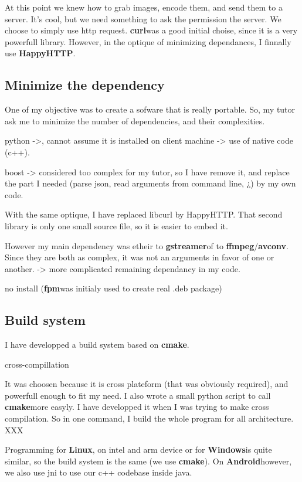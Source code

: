 \documentclass[a4paper,11pt]{custom}
\newcommand{\avconv}{\textbf{avconv}}
\newcommand{\ffmpeg}{\textbf{ffmpeg}}
\newcommand{\gstreamer}{\textbf{gstreamer}}
\newcommand{\curl}{\textbf{curl}}
\newcommand{\happyhttp}{\textbf{HappyHTTP}}
\newcommand{\cmake}{\textbf{cmake}}
\newcommand{\fpm}{\textbf{fpm}}
\newcommand{\linux}{\textbf{Linux}}
\newcommand{\win}{\textbf{Windows}}
\newcommand{\android}{\textbf{Android}}
\begin{document}
At this point we knew how to grab images, encode them, and send them to a
server. It's cool, but we need something to ask the permission the server. We
choose to simply use http request. \curl was a good initial choise, since it is
a very powerfull library. However, in the optique of minimizing dependances, I
finnally use \happyhttp.

\subsection{Minimize the dependency}

One of my objective was to create a sofware that is really portable. So, my
tutor ask me to minimize the number of dependencies, and their complexities.

python ->, cannot assume it is installed on client machine -> use of native code
(c++).

boost -> considered too complex for my tutor, so I have remove it, and replace
the part I needed (parse json, read arguments from command line, ¿) by my own
code.

With the same optique, I have replaced libcurl by HappyHTTP. That second library
is only one small source file, so it is easier to embed it.

However my main dependency was etheir to \gstreamer of to \ffmpeg/\avconv. Since
they are both as complex, it was not an arguments in favor of one or another.
-> more complicated remaining dependancy in my code.


no install (\fpm was initialy used to create real .deb package)

\subsection{Build system}

I have developped a build system based on \cmake.

cross-compillation

It was choosen because it is
cross plateform (that was obviously required), and powerfull enough to fit my
need. I also wrote a small python script to call \cmake more easyly. I have
developped it when I was trying to make cross compilation. So in one command, I
build the whole program for all architecture. XXX

Programming for \linux, on intel and arm device or for \win is quite similar, so
the build system is the same (we use \cmake). On \android however, we also use
jni to use our c++ codebase inside java.
\end{document}
